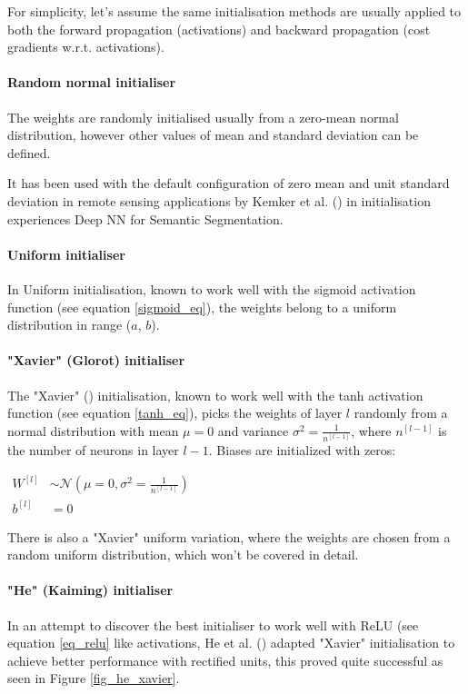 For simplicity, let's assume the same initialisation methods are usually applied to both the forward propagation (activations) and backward propagation (cost gradients \gls{w.r.t.} activations).

\paragraph{Random normal initialiser} The weights are randomly initialised usually from a zero-mean normal distribution, however other values of mean and standard deviation can be defined. 

It has been used with the default configuration of zero mean and unit standard deviation in remote sensing applications by Kemker et al. (\cite{kemker2018algorithms}) in initialisation experiences Deep \gls{NN} for Semantic Segmentation.

\paragraph{Uniform initialiser} In Uniform initialisation, known to work well with the sigmoid activation function (see equation \ref{sigmoid_eq}), the weights belong to a uniform distribution in range ($a$, $b$).

\paragraph{"Xavier" (Glorot) initialiser} The "Xavier" (\cite{pmlrv9glorot10a}) initialisation, known to work well with the tanh activation function (see equation \ref{tanh_eq}), picks the weights of layer $l$ randomly from a normal distribution with mean $\mu = 0$ and variance $\sigma^2 = \frac{1}{n^{[l-1]}}$, where $n^{[l-1]}$ is the number of neurons in layer $l-1$. Biases are initialized with zeros:

$\begin{aligned}W^{[l]} &\sim \mathcal{N}(\mu=0,\sigma^2 = \frac{1}{n^{[l-1]}})\\ b^{[l]} &= 0\end{aligned}$

There is also a  "Xavier" uniform variation, where the weights are chosen from a random uniform distribution, which won't be covered in detail.
\paragraph{"He" (Kaiming) initialiser} In an attempt to discover the best initialiser to work well with \gls{ReLU} (see equation \ref{eq_relu} like activations, He et al. (\cite{He_2015_ICCV}) adapted "Xavier" initialisation to achieve better performance with rectified units, this proved quite successful as seen in Figure \ref{fig_he_xavier}.

